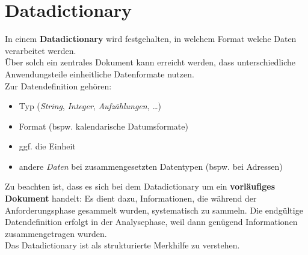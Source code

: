 \section{Datadictionary}

\begin{tcolorbox}[title=Dataditctionary]
    In einem \textbf{Datadictionary} wird festgehalten, in welchem Format welche Daten verarbeitet werden.\\
    Über solch ein zentrales Dokument kann erreicht werden, dass unterschiedliche Anwendungsteile einheitliche Datenformate nutzen.\\

    \noindent
    Zur Datendefinition gehören:
    \begin{itemize}
        \item Typ (\textit{String}, \textit{Integer}, \textit{Aufzählungen}, \ldots)
        \item Format (bspw. kalendarische Datumsformate)
        \item ggf. die Einheit
        \item andere \textit{Daten} bei zusammengesetzten Datentypen (bspw. bei Adressen)
    \end{itemize}

    \noindent
    Zu beachten ist, dass es sich bei dem Datadictionary um ein \textbf{vorläufiges Dokument} handelt: Es dient dazu, Informationen, die während der Anforderungsphase gesammelt wurden, systematisch zu sammeln. Die endgültige Datendefinition erfolgt in der Analysephase, weil dann genügend Informationen zusammengetragen wurden.    \\
    Das Datadictionary ist als strukturierte Merkhilfe zu verstehen.
\end{tcolorbox}
